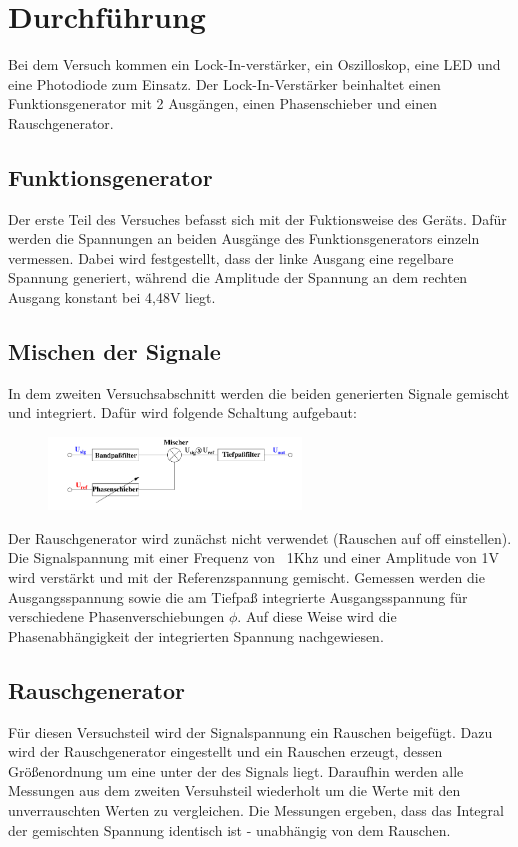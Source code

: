 \section{Durchführung}
\label{sec:Durchführung}

Bei dem Versuch kommen ein Lock-In-verstärker, ein Oszilloskop, eine
LED und eine Photodiode zum Einsatz. Der Lock-In-Verstärker beinhaltet
einen Funktionsgenerator  mit 2 Ausgängen, einen Phasenschieber und einen
Rauschgenerator.

\subsection{Funktionsgenerator}
Der erste Teil des Versuches befasst sich mit der Fuktionsweise des Geräts.
Dafür werden die Spannungen an beiden Ausgänge des Funktionsgenerators einzeln
vermessen. Dabei wird festgestellt, dass der linke Ausgang eine regelbare
Spannung generiert, während die Amplitude der Spannung an dem rechten
Ausgang konstant bei 4,48V liegt.

\subsection{Mischen der Signale}
In dem zweiten Versuchsabschnitt werden die beiden generierten Signale gemischt
und integriert. Dafür wird folgende Schaltung aufgebaut:

\begin{figure}
  \centering
  \includegraphics[keepaspectratio, width=0.6\textwidth]{Schaltung1.png}
  \label{fig:Schaltung1}
\end{figure}
\cite[1]{Anleitung}

Der Rauschgenerator wird zunächst nicht verwendet (Rauschen auf off einstellen).
Die Signalspannung mit einer Frequenz von ~1Khz und einer Amplitude von 1V
wird verstärkt und mit der
Referenzspannung gemischt. Gemessen werden die Ausgangsspannung sowie die am
Tiefpaß
integrierte Ausgangsspannung für verschiedene Phasenverschiebungen $\phi$. Auf
diese
Weise wird die Phasenabhängigkeit der integrierten Spannung nachgewiesen.

\subsection{Rauschgenerator}
Für diesen Versuchsteil wird der Signalspannung ein Rauschen beigefügt. Dazu
wird der Rauschgenerator eingestellt und ein Rauschen erzeugt, dessen
Größenordnung um eine unter der des Signals liegt. Daraufhin werden alle
Messungen aus dem zweiten Versuhsteil wiederholt um die Werte mit den
unverrauschten Werten zu vergleichen. Die Messungen ergeben, dass das Integral
der gemischten Spannung identisch ist - unabhängig von dem Rauschen.

